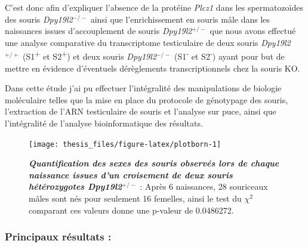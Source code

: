 \documentclass[12pt,twoside]{ugathesis}
\begin{document}
C'est donc afin d'expliquer l'absence de la protéine \emph{Plcz1} dans
les spermatozoïdes des souris \emph{Dpy19l2}\(^{-/-}\) ainsi que
l'enrichissement en souris mâle dans les naissances issues
d'accouplement de souris \emph{Dpy19l2}\(^{+/-}\) que nous avons
effectué une analyse comparative du transcriptome testiculaire de deux
souris \emph{Dpy19l2}\(^{+/+}\) (S1\textsuperscript{+} et
S2\textsuperscript{+}) et deux souris \emph{Dpy19l2}\(^{-/-}\)
(S1\textsuperscript{-} et S2\textsuperscript{-}) ayant pour but de
mettre en évidence d'éventuels dérèglements transcriptionnels chez la
souris KO.

Dans cette étude j'ai pu effectuer l'intégralité des manipulations de
biologie moléculaire telles que la mise en place du protocole de
génotypage des souris, l'extraction de l'ARN testiculaire de souris et
l'analyse sur puce, ainsi que l'intégralité de l'analyse bioinformatique
des résultats.

\newpage

\begin{figure}

{\centering \texttt{[image: thesis\_files/figure-latex/plotborn-1]} 

}

\caption[Quantification des sexes des souris observés lors de chaque naissance issues d'un croisement de deux souris hétérozygotes Dpy19l2$^{+/-}$]{\textbf{\emph{Quantification des sexes des souris
observés lors de chaque naissance issues d'un croisement de deux souris
hétérozygotes Dpy19l2\(^{+/-}\)}} : Après 6 naissances, 28 souriceaux
mâles sont nés pour seulement 16 femelles, ainsi le test du \(\chi^2\)
comparant ces valeurs donne une p-valeur de 0.0486272.}\label{fig:plotborn}
\end{figure}







\newpage



\newpage

\subsubsection{Principaux résultats :}\label{principaux-resultats-6}
\end{document}
